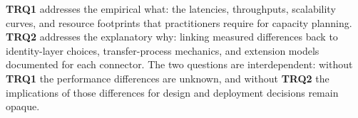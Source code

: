 \pagebreak

\textbf{TRQ1} addresses the empirical what: the latencies, throughputs, scalability curves, and resource footprints that practitioners require for capacity planning. \textbf{TRQ2} addresses the explanatory why: linking measured differences back to identity-layer choices, transfer-process mechanics, and extension models documented for each connector. The two questions are interdependent: without \textbf{TRQ1} the performance differences are unknown, and without \textbf{TRQ2} the implications of those differences for design and deployment decisions remain opaque.


